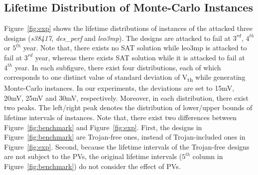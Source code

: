 \subsection{Lifetime Distribution of Monte-Carlo Instances}
\label{sec:exp:exp}
Figure~\ref{fig:exp} shows the lifetime distributions of instances of the attacked three designs (\textit{s38417}, \textit{des\_perf} and \textit{leo3mp}). The designs are attacked to fail at $3^{rd}$, $4^{th}$ or $5^{th}$ year. Note that, there exists no SAT solution while leo3mp is attacked to fail at $3^{rd}$ year, whereas there exists SAT solution while it is attacked to fail at $4^{th}$ year. In each subfigure, there exist four distributions, each of which corresponds to one distinct value of standard deviation of V\textsubscript{th} while generating Monte-Carlo instances. In our experiments, the deviations are set to 15mV, 20mV, 25mV and 30mV, respectively. Moreover, in each distribution, there exist two peaks. The left/right peak denotes the distribution of lower/upper bounds of lifetime intervals of instances. Note that, there exist two differences between Figure~\ref{fig:benchmark} and Figure~\ref{fig:exp}. First, the designs in Figure~\ref{fig:benchmark} are Trojan-free ones, instead of Trojan-included ones in Figure~\ref{fig:exp}. Second, because the lifetime intervals of the Trojan-free designs are not subject to the PVs, the original lifetime intervals ($5^{th}$ column in Figure~\ref{fig:benchmark}) do not consider the effect of PVs.

